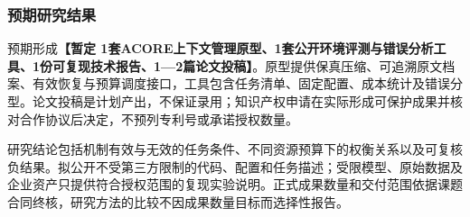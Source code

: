 \subsubsection{预期研究结果}
预期形成\textbf{【暂定 1套ACORE上下文管理原型、1套公开环境评测与错误分析工具、1份可复现技术报告、1—2篇论文投稿】}。原型提供保真压缩、可追溯原文档案、有效恢复与预算调度接口，工具包含任务清单、固定配置、成本统计及错误分型。论文投稿是计划产出，不保证录用；知识产权申请在实际形成可保护成果并核对合作协议后决定，不预列专利号或承诺授权数量。

研究结论包括机制有效与无效的任务条件、不同资源预算下的权衡关系以及可复核负结果。拟公开不受第三方限制的代码、配置和任务描述；受限模型、原始数据及企业资产只提供符合授权范围的复现实验说明。正式成果数量和交付范围依据课题合同终核，研究方法的比较不因成果数量目标而选择性报告。
